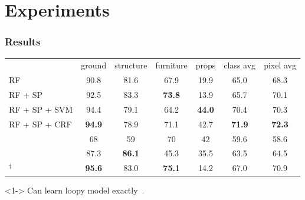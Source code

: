 \documentclass[final,ignorenonframetext,compress]{beamer}
\begin{document}
    \section{Experiments}
    
    \begin{frame}
        \frametitle{Results}
        \begin{table}[t]
        \begin{tabularx}{\linewidth}{@{\extracolsep{\fill}}lcccccc}
        \toprule
                                & \footnotesize ground        & \footnotesize  structure    & \footnotesize furniture     & \footnotesize props         & \footnotesize class avg   & \footnotesize pixel avg\\
        \cmidrule(r){1-7}

        \footnotesize RF                              &         90.8  &   81.6        & 67.9          & 19.9          &  65.0        &  68.3 \\
        \footnotesize RF + SP                         &         92.5  &   83.3        & \textbf{73.8} & 13.9          &  65.7        &  70.1 \\ 
        \footnotesize RF + SP + SVM                   &         94.4  &   79.1        & 64.2          & \textbf{44.0} &  70.4        &  70.3 \\
        \footnotesize RF + SP + CRF                   & \textbf{94.9} &   78.9        &          71.1 & 42.7          &\textbf{71.9} &  \textbf{72.3} \\
        \cmidrule(r){1-7}
        \footnotesize \citet{SilbermanECCV12}         &         68    &   59          & 70           & 42            &  59.6        & 58.6 \\
        \footnotesize \citet{couprie-iclr-13}         &         87.3  & \textbf{86.1} & 45.3         & 35.5          &  63.5        & 64.5 \\
        \cmidrule(r){1-7}
        \footnotesize \citet{stueckler2013}$^\dagger$ & \textbf{95.6} &   83.0        & \textbf{75.1}& 14.2          &  67.0        & 70.9 \\

        \bottomrule
        \end{tabularx}
        \end{table}
        \begin{visibleenv}<1->
        Can learn loopy model exactly~\citep{mueller2014_exact}.
        \end{visibleenv}
    \end{frame}
\end{document}

